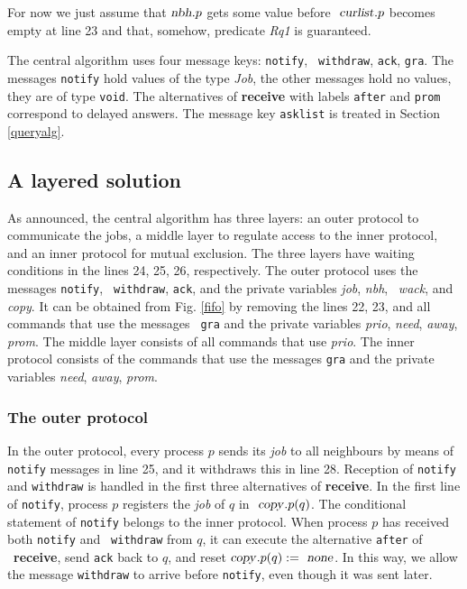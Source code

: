 \documentclass[10pt]{article} \usepackage[english]{babel}
\def\S #1/{\mbox {\textsl{#1}}}
\def\B #1/{\mbox {\textbf{#1}}}
\def\T #1/{\mbox {\texttt{#1}}}
\begin{document}
For now we just assume that $\S nbh/.p$ gets some value before $\S
curlist/.p$ becomes empty at line 23 and that, somehow, predicate
\S Rq1/ is guaranteed.  

The central algorithm uses four message keys: \T notify/, \T
withdraw/, \T ack/, \T gra/. The messages \T notify/ hold values of
the type \S Job/, the other messages hold no values, they are of type
\T void/.  The alternatives of \B receive/ with labels \T after/ and
\T prom/ correspond to delayed answers.  The message key \T asklist/
is treated in Section \ref{queryalg}.

\subsection{A layered solution} \label{layered}

As announced, the central algorithm has three layers: an outer
protocol to communicate the jobs, a middle layer to regulate access to
the inner protocol, and an inner protocol for mutual exclusion.  The
three layers have waiting conditions in the lines 24, 25, 26,
respectively.  The outer protocol uses the messages \T notify/, \T
withdraw/, \T ack/, and the private variables \S job/, \S nbh/, \S
wack/, and \S copy/. It can be obtained from Fig. \ref{fifo} by
removing the lines 22, 23, and all commands that use the messages \T
gra/ and the private variables \S prio/, \S need/, \S away/, \S prom/.
The middle layer consists of all commands that use \S prio/.  The
inner protocol consists of the commands that use the messages \T gra/
and the private variables \S need/, \S away/, \S prom/.

\subsubsection{The outer protocol } \label{introOuter}

In the outer protocol, every process $p$ sends its \S job/ to all
neighbours by means of \T notify/ messages in line 25, and it
withdraws this in line 28. Reception of \T notify/ and \T withdraw/ is
handled in the first three alternatives of \B receive/.  In the first
line of \T notify/, process $p$ registers the \S job/ of $q$ in $\S
copy/.p(q)$.  The conditional statement of \T notify/ belongs to the
inner protocol.  When process $p$ has received both \T notify/ and \T
withdraw/ from $q$, it can execute the alternative \T after/ of \B
receive/, send \T ack/ back to $q$, and reset $\S copy/.p(q):= \S
none/$.  In this way, we allow the message \T withdraw/ to arrive
before \T notify/, even though it was sent later.
\end{document}
